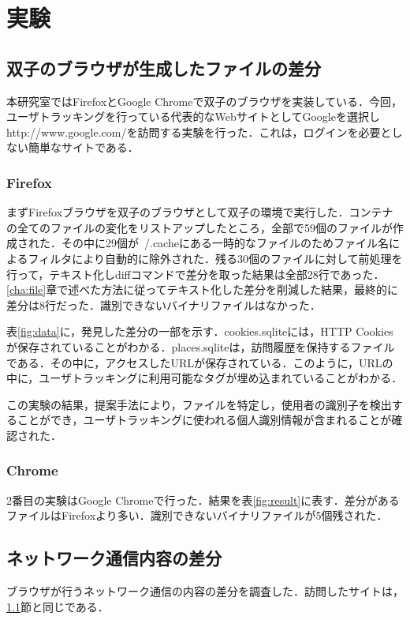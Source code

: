 \documentclass[submit,techrep]{ipsj}
\begin{document}
\section{実験}
\subsection{双子のブラウザが生成したファイルの差分}
\label{sec:file}

本研究室ではFirefoxとGoogle Chromeで双子のブラウザを実装している．今回，ユーザトラッキングを行っている代表的なWebサイトとしてGoogleを選択しhttp://www.google.com/を訪問する実験を行った．これは，ログインを必要としない簡単なサイトである．

\subsubsection{Firefox}
まずFirefoxブラウザを双子のブラウザとして双子の環境で実行した．コンテナの全てのファイルの変化をリストアップしたところ，全部で59個のファイルが作成された．その中に29個が~/.cacheにある一時的なファイルのためファイル名によるフィルタにより自動的に除外された．残る30個のファイルに対して前処理を行って，テキスト化しdiffコマンドで差分を取った結果は全部28行であった．\ref{cha:file}章で述べた方法に従ってテキスト化した差分を削減した結果，最終的に差分は8行だった．識別できないバイナリファイルはなかった．

表\ref{fig:data}に，発見した差分の一部を示す．cookies.sqliteには，HTTP Cookiesが保存されていることがわかる．places.sqliteは，訪問履歴を保持するファイルである．その中に，アクセスしたURLが保存されている．このように，URLの中に，ユーザトラッキングに利用可能なタグが埋め込まれていることがわかる．

この実験の結果，提案手法により，ファイルを特定し，使用者の識別子を検出することができ，ユーザトラッキングに使われる個人識別情報が含まれることが確認された．

\subsubsection{Chrome}

2番目の実験はGoogle Chromeで行った．結果を表\ref{fig:result}に表す．差分があるファイルはFirefoxより多い．識別できないバイナリファイルが5個残された．

\label{sec:one}
\subsection{ネットワーク通信内容の差分}
ブラウザが行うネットワーク通信の内容の差分を調査した．訪問したサイトは，\ref{sec:file}節と同じである．
\end{document}
